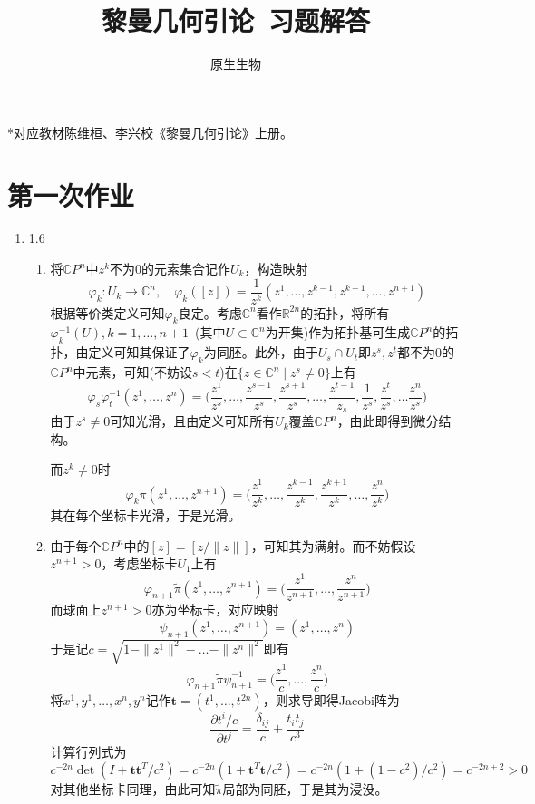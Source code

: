 \documentclass[a4paper,UTF8,fontset=windows,10pt]{ctexart}
\title{\heiti 黎曼几何引论\ 习题解答}
\author{原生生物}
\date{}
\newcommand*{\bc}{\mathbb{C}}
\newcommand*{\br}{\mathbb{R}}
\begin{document}
\maketitle

*对应教材陈维桓、李兴校《黎曼几何引论》上册。

\tableofcontents

\newpage

\section{第一次作业}
\begin{enumerate}
    \item 1.6
    \begin{enumerate}[(1)]
        \item 将$\bc P^n$中$z^k$不为0的元素集合记作$U_k$，构造映射
        $$\varphi_k:U_k\to\mathbb{C}^n,\quad\varphi_k([z])=\frac{1}{z^k}(z^1,\dots,z^{k-1},z^{k+1},\dots,z^{n+1})$$
        根据等价类定义可知$\varphi_k$良定。考虑$\bc^n$看作$\br^{2n}$的拓扑，将所有$\varphi_k^{-1}(U),k=1,\dots,{n+1}$\ (其中$U\subset\bc^n$为开集)作为拓扑基可生成$\bc P^n$的拓扑，由定义可知其保证了$\varphi_k$为同胚。此外，由于$U_s\cap U_t$即$z^s,z^t$都不为0的$\bc P^n$中元素，可知(不妨设$s<t$)在$\{z\in\bc^n\mid z^s\ne0\}$上有
        $$\varphi_s\varphi_t^{-1}(z^1,\dots,z^n)=\bigg(\frac{z^1}{z^s},\dots,\frac{z^{s-1}}{z^s},\frac{z^{s+1}}{z^s},\dots,\frac{z^{t-1}}{z_s},\frac{1}{z^s},\frac{z^t}{z^s},\dots\frac{z^n}{z^s}\bigg)$$
        由于$z^s\ne 0$可知光滑，且由定义可知所有$U_k$覆盖$\bc P^n$，由此即得到微分结构。
    
        而$z^k\ne0$时
        $$\varphi_k\pi(z^1,\dots,z^{n+1})=\bigg(\frac{z^1}{z^k},\dots,\frac{z^{k-1}}{z^k},\frac{z^{k+1}}{z^k},\dots,\frac{z^n}{z^k}\bigg)$$
        其在每个坐标卡光滑，于是光滑。
    
        \item 由于每个$\bc P^n$中的$[z]=[z/\|z\|]$，可知其为满射。而不妨假设$z^{n+1}>0$，考虑坐标卡$U_1$上有
        $$\varphi_{n+1}\tilde\pi(z^1,\dots,z^{n+1})=\bigg(\frac{z^1}{z^{n+1}},\dots,\frac{z^n}{z^{n+1}}\bigg)$$
        而球面上$z^{n+1}>0$亦为坐标卡，对应映射
        $$\psi_{n+1}(z^1,\dots,z^{n+1})=(z^1,\dots,z^n)$$
        于是记$c=\sqrt{1-\|z^1\|^2-\dots-\|z^n\|^2}$即有
        $$\varphi_{n+1}\tilde\pi\psi_{n+1}^{-1}=\bigg(\frac{z^1}{c},\dots,\frac{z^n}{c}\bigg)$$
        将$x^1,y^1,\dots,x^n,y^n$记作$\mathbf{t}=(t^1,\dots,t^{2n})$，则求导即得Jacobi阵为
        $$\frac{\partial t^i/c}{\partial t^j}=\frac{\delta_{ij}}{c}+\frac{t_it_j}{c^3}$$
        计算行列式为
        $$c^{-2n}\det(I+\mathbf{t}\mathbf{t}^T/c^2)=c^{-2n}(1+\mathbf{t}^T\mathbf{t}/c^2)=c^{-2n}(1+(1-c^2)/c^2)=c^{-2n+2}>0$$
        对其他坐标卡同理，由此可知$\tilde\pi$局部为同胚，于是其为浸没。
    

\end{enumerate}
\end{enumerate}
\end{document}
